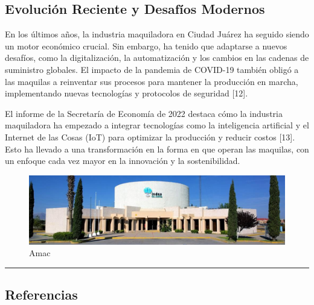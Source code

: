 \documentclass[
  10pt,
  letterpaper,
]{book}
\begin{document}
\subsection{Evolución Reciente y Desafíos
Modernos}\label{evoluciuxf3n-reciente-y-desafuxedos-modernos}

En los últimos años, la industria maquiladora en Ciudad Juárez ha
seguido siendo un motor económico crucial. Sin embargo, ha tenido que
adaptarse a nuevos desafíos, como la digitalización, la automatización y
los cambios en las cadenas de suministro globales. El impacto de la
pandemia de COVID-19 también obligó a las maquilas a reinventar sus
procesos para mantener la producción en marcha, implementando nuevas
tecnologías y protocolos de seguridad {[}12{]}.

El informe de la Secretaría de Economía de 2022 destaca cómo la
industria maquiladora ha empezado a integrar tecnologías como la
inteligencia artificial y el Internet de las Cosas (IoT) para optimizar
la producción y reducir costos {[}13{]}. Esto ha llevado a una
transformación en la forma en que operan las maquilas, con un enfoque
cada vez mayor en la innovación y la sostenibilidad.

\begin{figure}[H]

{\centering \includegraphics{Img/Amac.jpg}

}

\caption{Amac}

\end{figure}%

\begin{center}\rule{0.5\linewidth}{0.5pt}\end{center}

\subsection{Referencias}\label{referencias}
\end{document}
